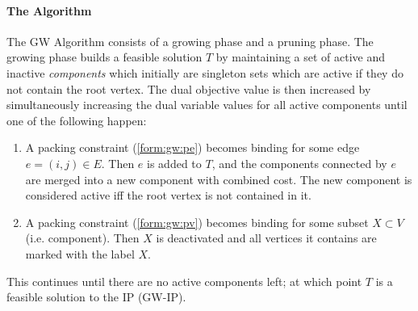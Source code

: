  \paragraph{The Algorithm} The GW Algorithm consists of a growing phase and a pruning phase. The growing phase
 builds a feasible solution $T$ by maintaining a set of active and inactive \textit{components} which
 initially are singleton sets which are active if they do not contain the root vertex. The dual objective value is then
  increased by simultaneously increasing
  the dual variable values for all active components until one of the following happen:
 \begin{enumerate}[label=\alph*)]
 \item A packing constraint (\ref{form:gw:pe}) becomes binding for some edge $e = (i,j) \in E$. Then $e$ is added
   to $T$, and the components connected by $e$ are merged into a new component with combined cost.
   The new component is considered active iff the root vertex is not contained in it.
 \item A packing constraint (\ref{form:gw:pv}) becomes binding for some subset $X  \subset V$ (i.e. component). Then $X$ is deactivated
    and all vertices it contains are marked with the label $X$.
 \end{enumerate}
 This continues until there are no active components left; at which point $T$ is a feasible solution to the IP (GW-IP).

